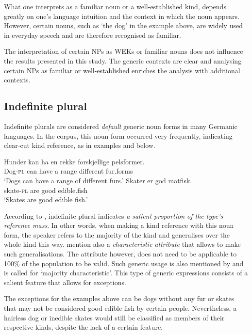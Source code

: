 \documentclass[output=paper]{langsci/langscibook}
\begin{document}
What one interprets as a familiar noun or a well-established kind, depends greatly on one's language intuition and the context in which the noun appears. However, certain nouns, such as `the dog' in the example above, are widely used in everyday speech and are therefore recognised as familiar.

The interpretation of certain NPs as WEKs or familiar nouns does not influence the results presented in this study. The generic contexts are clear and analysing certain NPs as familiar or well-established enriches the analysis with additional contexts.


\subsection{Indefinite plural}
\label{sub:indpl}
Indefinite plurals are considered \textit{default} generic noun forms in many Germanic languages. In the corpus, this noun form occurred very frequently, indicating clear-cut kind reference, as in examples  and  below.

\ea\label{ex:dogs}
    \gll Hunder kan ha en rekke forskjellige pelsformer. \\
		Dog-\textsc{pl} can have a range different fur.forms \\
	\glt `Dogs can have a range of different furs.'
\ex\label{ex:skates}
    \gll Skater er god matfisk. \\
		skate-\textsc{pl} are good edible.fish \\
	\glt `Skates are good edible fish.'
\z

According to \citet[224]{Radden2009}, indefinite plural indicates \textit{a salient proportion of the type's reference mass}. In other words, when making a kind reference with this noun form, the speaker refers to the majority of the kind and generalises over the whole kind this way. \citet[111]{Radden2007} mention also a \textit{characteristic attribute} that allows to make such generalisations. The attribute however, does not need to be applicable to 100\% of the population to be valid. Such generic usage is also mentioned by \citet[]{Leslie-etal2011} and is called for `majority characteristic'. This type of generic expressions consists of a salient feature that allows for exceptions.

The exceptions for the examples above can be dogs without any fur or skates that may not be considered good edible fish by certain people. Nevertheless, a hairless dog or inedible skates would still be classified as members of their respective kinds, despite the lack of a certain feature.
\end{document}
